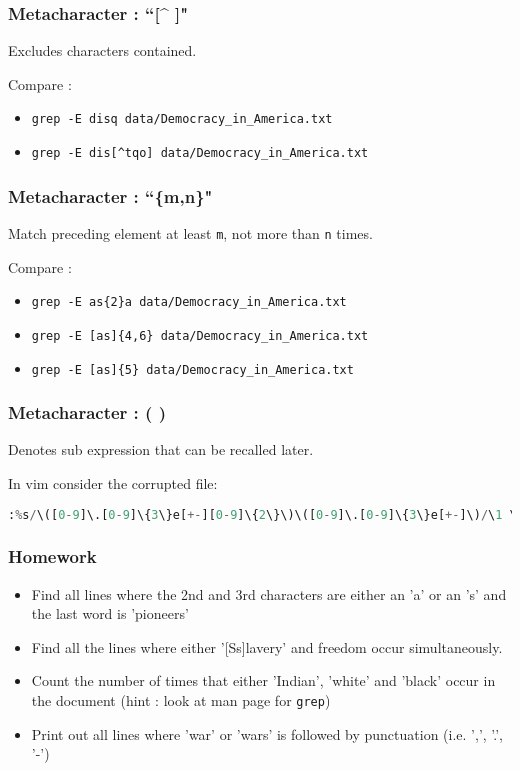 \documentclass{beamer}
\newcommand{\code}[1]{\colorbox{codegray}{\texttt{#1}}}
\begin{document}
\begin{frame}
\frametitle{Metacharacter : ``[\^{} ]"}
Excludes characters contained. 
\bigskip

Compare :
\begin{itemize}
    \item \code{grep -E disq data/Democracy\_in\_America.txt}
    \pause
    \item \code{grep -E dis[\^{}tqo] data/Democracy\_in\_America.txt}
\end{itemize}
\end{frame}

\begin{frame}
\frametitle{Metacharacter : ``\{m,n\}"}
Match preceding element at least \code{m}, not more than \code{n} times.
\bigskip

Compare :
\begin{itemize}
    \item \code{grep -E as\{2\}a data/Democracy\_in\_America.txt}
    \pause
    \item \code{grep -E [as]\{4,6\} data/Democracy\_in\_America.txt}
    \pause
    \item \code{grep -E [as]\{5\} data/Democracy\_in\_America.txt}
\end{itemize}
\end{frame}

\begin{frame}[fragile]
\frametitle{Metacharacter : ( ) }
\begingroup
Denotes sub expression that can be recalled later.
\bigskip

In vim consider the corrupted file:
\begin{lstlisting}[backgroundcolor = \color{codegray}, language = Python, showstringspaces=false, breaklines=true]
:%s/\([0-9]\.[0-9]\{3\}e[+-][0-9]\{2\}\)\([0-9]\.[0-9]\{3\}e[+-]\)/\1 \2/gc
\end{lstlisting}
\endgroup
\end{frame}




\begin{frame}
\frametitle{Homework}
\begin{itemize}
    \item Find all lines where the 2nd and 3rd characters are either an 'a' or an 's' and the last word is 'pioneers'
    \pause
    \item Find all the lines where either '[Ss]lavery' and freedom occur simultaneously.
    \pause
    \item Count the number of times that either 'Indian', 'white' and 'black' occur in the document (hint : look at man page for \code{grep})
    \pause
    \item Print out all lines where 'war' or 'wars' is followed by punctuation (i.e. ',', '.', '-')
\end{itemize}
\end{frame}
\end{document}
